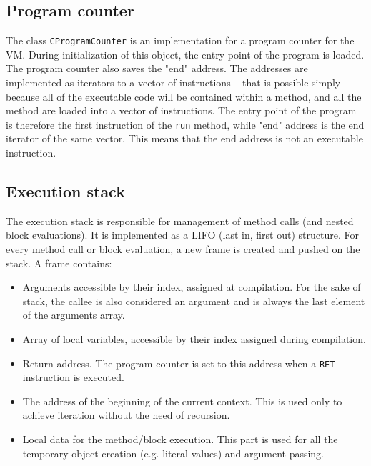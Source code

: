 \documentclass[thesis=M,english]{FITthesis}[2019/12/23]
\begin{document}
\subsection{Program counter}
The class \texttt{CProgramCounter} is an implementation for a program counter for the VM. During initialization of this object, the entry point of the program is loaded.
The program counter also saves the "end" address. The addresses are implemented as iterators to a vector of instructions -- that is possible simply because all of the
executable code will be contained within a method, and all the method are loaded into a vector of instructions. The entry point of the program is therefore the first
instruction of the \texttt{run} method, while "end" address is the end iterator of the same vector. This means that the end address is not an executable instruction.

\subsection{Execution stack}
The execution stack is responsible for management of method calls (and nested block evaluations). It is implemented as a LIFO (last in, first out) structure.
For every method call or block evaluation, a new frame is created and pushed on the stack. A frame contains:
\begin{itemize}
	\item Arguments accessible by their index, assigned at compilation. For the sake of stack, the callee is also considered an argument and is always
		the last element of the arguments array.
	\item Array of local variables, accessible by their index assigned during compilation.
	\item Return address. The program counter is set to this address when a \texttt{RET} instruction is executed.
	\item The address of the beginning of the current context. This is used only to achieve iteration without the need of recursion.
	\item Local data for the method/block execution. This part is used for all the temporary object creation (e.g. literal values) and argument passing.
\end{itemize}
\end{document}
